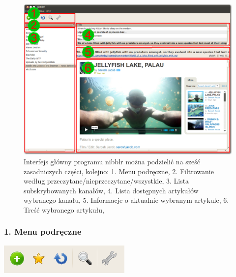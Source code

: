 \documentclass[a4paper,11pt]{report}
\begin{document}
\begin{figure}[h]
	\includegraphics[scale=0.27]{./img/nibblr1.png}
	\caption{Interfejs główny programu nibblr można podzielić na sześć zasadniczych części, kolejno: 
		\newline \hspace* {1,5cm}1. Menu podręczne,
		\newline \hspace* {1,5cm}2. Filtrowanie według przeczytane/nieprzeczytane/wszystkie,
		\newline \hspace* {1,5cm}3. Lista subskrybowanych kanałów,
		\newline \hspace* {1,5cm}4. Lista dostępnych artykułów wybranego kanału,
		\newline \hspace* {1,5cm}5. Informacje o aktualnie wybranym artykule, 
		\newline \hspace* {1,5cm}6. Treść wybranego artykułu,
	}
	\label{fig:interface6}
\end{figure}

\newpage
\subsubsection*{1. Menu podręczne}

\includegraphics[scale=0.8]{./img/menu.png}
\end{document}
